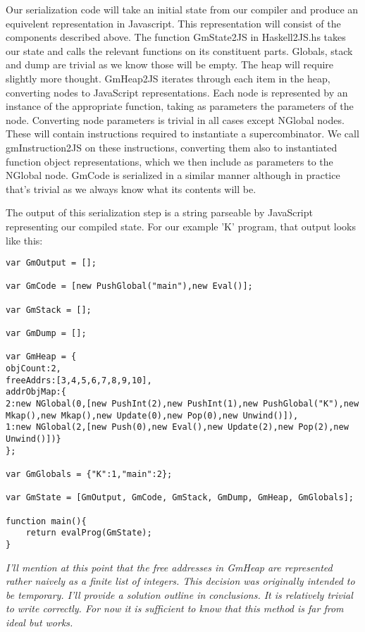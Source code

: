 Our serialization code will take an initial state from our
compiler and produce an equivelent representation in Javascript.
This representation will consist of the components described
above. The function GmState2JS in Haskell2JS.hs takes our 
state and calls the relevant functions on its constituent 
parts. Globals, stack and dump are trivial as we know those
will be empty. The heap will require slightly more thought.
GmHeap2JS iterates through each item in the heap, converting
nodes to JavaScript representations. Each node is represented
by an instance of the appropriate function, taking as parameters
the parameters of the node. Converting node parameters is 
trivial in all cases except NGlobal nodes. These will contain
instructions required to instantiate a supercombinator. We
call gmInstruction2JS on these instructions, converting them
also to instantiated function object representations, which
we then include as parameters to the NGlobal node. GmCode
is serialized in a similar manner although in practice that's
trivial as we always know what its contents will be.

The output of this serialization step is a string parseable
by JavaScript representing our compiled state. For our example
'K' program, that output looks like this:

\begin{verbatim}
var GmOutput = [];
 
var GmCode = [new PushGlobal("main"),new Eval()];
 
var GmStack = [];
 
var GmDump = [];
 
var GmHeap = {
objCount:2,
freeAddrs:[3,4,5,6,7,8,9,10],
addrObjMap:{
2:new NGlobal(0,[new PushInt(2),new PushInt(1),new PushGlobal("K"),new Mkap(),new Mkap(),new Update(0),new Pop(0),new Unwind()]),
1:new NGlobal(2,[new Push(0),new Eval(),new Update(2),new Pop(2),new Unwind()])}
};
 
var GmGlobals = {"K":1,"main":2};
 
var GmState = [GmOutput, GmCode, GmStack, GmDump, GmHeap, GmGlobals]; 
 
function main(){
	return evalProg(GmState);
}
\end{verbatim}

\emph{
I'll mention at this point that the free addresses in GmHeap
are represented rather naively as a finite list of integers.
This decision was originally intended to be temporary. I'll
provide a solution outline in conclusions. It is relatively
trivial to write correctly. For now it is sufficient to
know that this method is far from ideal but works.
}

